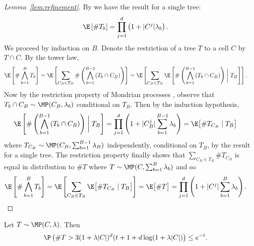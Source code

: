 \documentclass{article}
\begin{document}
\begin{proof}[Lemma~\ref{lem:refinement}]

  By \cite[Proposition~2]{mourtada2020minimax}
  we have the result for a single tree:
  \begin{align*}
    \E\left[\# T_b \right]
    &= \prod_{j=1}^d \left(
      1 + |C^j| \lambda_b
      \right).
  \end{align*}
  We proceed by induction on $B$.
  Denote the restriction of a tree $T$ to a cell $C$ by $T \cap C$.
  By the tower law,
  \begin{align*}
    \E\left[\# \bigwedge_{b=1}^B T_b \right]
    &=
      \E\left[
      \sum_{C_B \in T_B}
      \#
      \left(
      \bigwedge_{b=1}^{B-1} (T_b \cap C_B)
      \right)
      \right]
      = \E\left[
      \sum_{C_B \in T_B}
      \E\left[
      \#
      \left(
      \bigwedge_{b=1}^{B-1} (T_b \cap C_B)
      \right)
      \biggm| T_B
      \right]
      \right].
  \end{align*}
  Now by the restriction property of Mondrian processes
  \cite[Fact~2]{mourtada2020minimax},
  observe that $T_b \cap C_B \sim \MP(C_B, \lambda_b)$
  conditional on $T_B$.
  Then by the induction hypothesis,
  \begin{align*}
    \E\left[
    \#
    \left(
    \bigwedge_{b=1}^{B-1} (T_b \cap C_B)
    \right)
    \biggm| T_B
    \right]
    &=
      \prod_{j=1}^d \left(
      1 + |C_B^j| \sum_{b=1}^{B-1} \lambda_b
      \right)
      = \E\big[
      \# T_{C_B} \mid T_B
      \big]
  \end{align*}
  where $T_{C_B} \sim \MP(C_B, \sum_{b=1}^{B-1} \lambda_B)$
  independently, conditional on $T_B$,
  by the result for a single tree.
  The restriction property finally shows that
  $\sum_{C_B \in T_B} \# T_{C_B}$ is equal in distribution
  to $\# T$ where $T \sim \MP(C, \sum_{b=1}^B \lambda_b)$
  and so
  \begin{align*}
    \E\left[\# \bigwedge_{b=1}^B T_b \right]
    &=
      \E\left[
      \sum_{C_B \in T_B}
      \E\big[
      \# T_{C_B} \mid T_B
      \big]
      \right]
      =
      \E\big[\# T \big]
      = \prod_{j=1}^d \left(
      1 + |C^j| \sum_{b=1}^B \lambda_b
      \right).
  \end{align*}
\end{proof}






\begin{lemma}
  \label{lem:cells_tail}

  Let $T \sim \MP(C, \lambda)$. Then
  \begin{align*}
    \P\left(\# T >
    3
    (1 + \lambda |C|)^d
    (t + 1 + d \log(1 + \lambda |C|)
    \right)
    &\leq
      e^{-t}.
  \end{align*}

\end{lemma}
\end{document}
